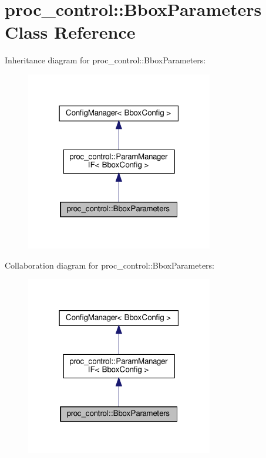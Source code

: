\hypertarget{classproc__control_1_1_bbox_parameters}{}\section{proc\+\_\+control\+:\+:Bbox\+Parameters Class Reference}
\label{classproc__control_1_1_bbox_parameters}


Inheritance diagram for proc\+\_\+control\+:\+:Bbox\+Parameters\+:\nopagebreak
\begin{figure}[H]
\begin{center}
\leavevmode
\includegraphics[width=232pt]{classproc__control_1_1_bbox_parameters__inherit__graph}
\end{center}
\end{figure}


Collaboration diagram for proc\+\_\+control\+:\+:Bbox\+Parameters\+:\nopagebreak
\begin{figure}[H]
\begin{center}
\leavevmode
\includegraphics[width=232pt]{classproc__control_1_1_bbox_parameters__coll__graph}
\end{center}
\end{figure}
